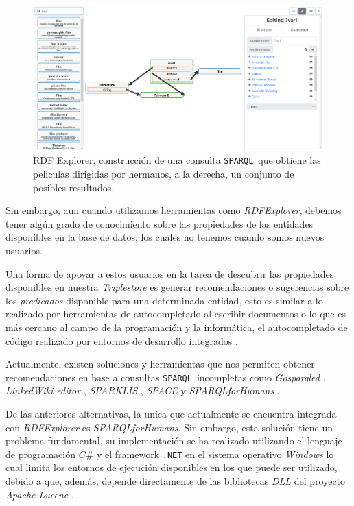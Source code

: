 \documentclass[conference,compsoc]{IEEEtran}
\newcommand{\spql}{\texttt{SPARQL}\ }
\begin{document}
\begin{figure}
    \centering
    \includegraphics[width=\linewidth]{rdfexplorer.png}
    \caption{RDF Explorer, construcción de una consulta \spql que obtiene las peliculas dirigidas
    por hermanos, a la derecha, un conjunto de posibles resultados.}
    \label{fig:rdfexplorer}
\end{figure}

Sin embargo, aun cuando utilizamos herramientas como \textit{RDFExplorer}, debemos tener
algún grado de conocimiento sobre las propiedades de las entidades disponibles
en la base de datos, los cuales no tenemos cuando somos nuevos usuarios.

Una forma de apoyar a estos usuarios en la tarea de descubrir las propiedades disponibles
en nuestra \textit{Triplestore} es generar recomendaciones o sugerencias sobre los \textit{predicados}
disponible para una determinada entidad, esto es similar a lo realizado por herramientas de autocompletado
al escribir documentos o lo que es más cercano al campo de la programación y la informática, el
autocompletado de código realizado por entornos de desarrollo integrados \cite{bruch2009learning}.

Actualmente, existen soluciones y herramientas que nos permiten obtener recomendaciones en base a 
consultas \spql incompletas como \textit{Gosparqled} \cite{campinas2014live}, \textit{LinkedWiki editor}
\cite{rafes2018designing}, \textit{SPARKLIS} \cite{ferre2017sparklis}, \textit{SPACE} \cite{kramer2013space}
y \textit{SPARQLforHumans} \cite{parra2020autocompletion}.

De las anteriores alternativas, la unica que actualmente se encuentra integrada con \textit{RDFExplorer}
es \textit{SPARQLforHumans}. Sin embargo, esta solución tiene un problema fundamental, su implementación
se ha realizado utilizando el lenguaje de programación $C\#$ y el framework \texttt{.NET} en el sistema
operativo \textit{Windows} lo cual limita los entornos de ejecución disponibles en los que puede ser utilizado,
debido a que, además, depende directamente de las bibliotecas \textit{DLL} del proyecto \textit{Apache Lucene}
\cite{bialecki2012apache}.
\end{document}
